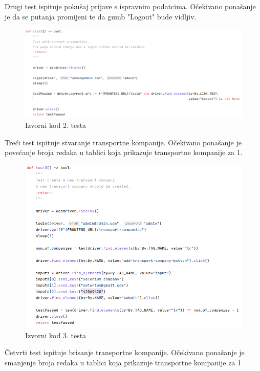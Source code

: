 			Drugi test ispituje pokušaj prijave s ispravnim podatcima. Očekivano ponašanje je da se putanja promijeni te da gumb "Logout" bude vidljiv.
			
			\begin{figure}[H]
				\includegraphics[width=\textwidth]{slike/selenium_test2.png}
				\centering
				\caption{Izvorni kod 2. testa}
				\label{fig:izvorni-kod-testa-2}
			\end{figure}
		
			Treći test ispituje stvaranje transportne kompanije. Očekivano ponašanje je povećanje broja redaka u tablici koja prikazuje transportne kompanije za 1.
		
			\begin{figure}[H]
				\includegraphics[width=\textwidth]{slike/selenium_test3.png}
				\centering
				\caption{Izvorni kod 3. testa}
				\label{fig:izvorni-kod-testa-3}
			\end{figure}
		
			Četvrti test ispituje brisanje transportne kompanije. Očekivano ponašanje je smanjenje broja redaka u tablici koja prikazuje transportne kompanije za 1
		
